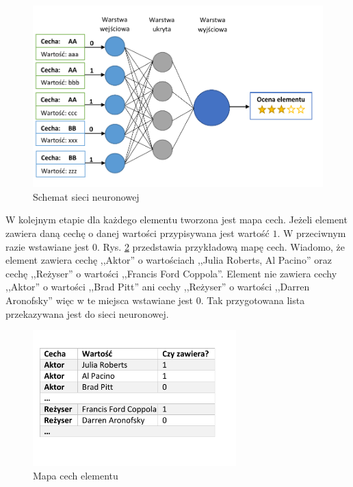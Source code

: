 \documentclass[twoside]{iisthesis}
\begin{document}
		 \begin{figure}[!ht] 
		 	\centering
		 	\includegraphics[width=1\textwidth]{siecneuronowa}
		 	\caption{Schemat sieci neuronowej}
		 	\label{fig:siecneuronowa}
		 \end{figure}
		 
		 W kolejnym etapie dla każdego elementu tworzona jest mapa cech. Jeżeli element zawiera daną cechę o danej wartości przypisywana jest wartość $1$. W przeciwnym razie wstawiane jest $0$. Rys. \ref{fig:mapacech} przedstawia przykładową mapę cech. Wiadomo, że element zawiera cechę ,,Aktor'' o wartościach ,,Julia Roberts, Al Pacino'' oraz cechę ,,Reżyser'' o wartości ,,Francis Ford Coppola''. Element nie zawiera cechy ,,Aktor'' o wartości ,,Brad Pitt'' ani cechy ,,Reżyser'' o wartości ,,Darren Aronofsky'' więc w te miejsca wstawiane jest $0$.
		  Tak przygotowana lista przekazywana jest do sieci neuronowej. 
		 
		 \begin{figure}[!ht] 
		 	\centering
		 	\includegraphics[width=0.7\textwidth]{mapacech}
		 	\caption{Mapa cech elementu}
		 	\label{fig:mapacech}
		 \end{figure}
		 
\end{document}
